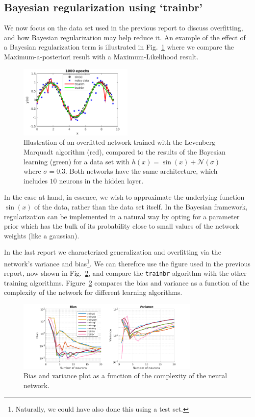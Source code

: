 \documentclass[pdftex,11pt,a4paper]{article}
\begin{document}
\subsection{Bayesian regularization using `trainbr'}
We now focus on the data set used in the previous report to discuss overfitting, and how Bayesian regularization may help reduce it.  An example of the effect of a Bayesian regularization term is illustrated in Fig.~\ref{fig:overfitting_example} where we compare the Maximum-a-posteriori result with a Maximum-Likelihood result.
\begin{figure}[htb]
\centering
\includegraphics[width=0.5\textwidth]{figs/overfitting_example.png}
\caption{Illustration of an overfitted network trained with the Levenberg-Marquadt algorithm (red), compared to the results of the Bayesian learning (green) for a data set with $h(x)=\sin(x) + \mathcal{N}(\sigma)$ where $\sigma = 0.3$. Both networks have the same architecture, which includes $10$ neurons in the hidden layer.\label{fig:overfitting_example}}
\end{figure}
In the case at hand, in essence, we wish to approximate the underlying function $\sin(x)$ of the data, rather than the data set itself. In the Bayesian framework, regularization can be implemented in a natural way by opting for a parameter prior which has the bulk of its probability close to small values of the network weights (like a gaussian). 

In the last report we characterized generalization and overfitting via the network's variance and bias\footnote{Naturally, we could have also done this using a test set.}. We can therefore use the figure used in the previous report, now shown in Fig.~\ref{fig:bias_and_variance_plot}, and compare the \texttt{trainbr} algorithm with the other training algorithms. Figure~\ref{fig:bias_and_variance_plot} compares the bias and variance as a function of the complexity of the network for different learning algorithms.
 
\begin{figure}[hbt]
\centering
\includegraphics[width=0.8\textwidth]{figs/bias_and_variance.png}
\caption{Bias and variance plot as a function of the complexity of the neural network.\label{fig:bias_and_variance_plot}}
\end{figure}
\end{document}

